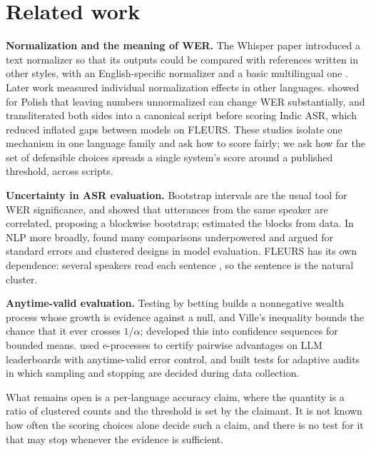 \section{Related work}
\label{sec:related}

\textbf{Normalization and the meaning of WER.} The Whisper paper introduced a text normalizer so that its outputs could be compared with references written in other styles, with an English-specific normalizer and a basic multilingual one \citep{radford2022whisper}. Later work measured individual normalization effects in other languages. \citet{kacprzak2026digits} showed for Polish that leaving numbers unnormalized can change WER substantially, and \citet{pattnayak2026snwer} transliterated both sides into a canonical script before scoring Indic ASR, which reduced inflated gaps between models on FLEURS. These studies isolate one mechanism in one language family and ask how to score fairly; we ask how far the set of defensible choices spreads a single system's score around a published threshold, across scripts.

\textbf{Uncertainty in ASR evaluation.} Bootstrap intervals are the usual tool for WER significance, and \citet{liu2019blockwise} showed that utterances from the same speaker are correlated, proposing a blockwise bootstrap; \citet{liu2022dependent} estimated the blocks from data. In NLP more broadly, \citet{card2020power} found many comparisons underpowered and \citet{miller2024errorbars} argued for standard errors and clustered designs in model evaluation. FLEURS has its own dependence: several speakers read each sentence \citep{conneau2022fleurs}, so the sentence is the natural cluster.

\textbf{Anytime-valid evaluation.} Testing by betting builds a nonnegative wealth process whose growth is evidence against a null, and Ville's inequality bounds the chance that it ever crosses $1/\alpha$; \citet{waudbysmith2020betting} developed this into confidence sequences for bounded means. \citet{gao2026anytime} used e-processes to certify pairwise advantages on LLM leaderboards with anytime-valid error control, and \citet{zhou2026adaptive} built tests for adaptive audits in which sampling and stopping are decided during data collection.

What remains open is a per-language accuracy claim, where the quantity is a ratio of clustered counts and the threshold is set by the claimant. It is not known how often the scoring choices alone decide such a claim, and there is no test for it that may stop whenever the evidence is sufficient.

